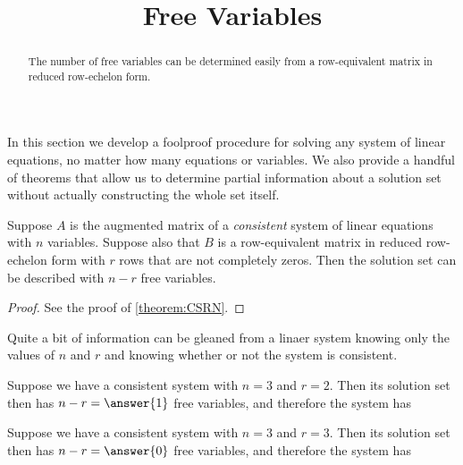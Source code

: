 \documentclass{ximera}
\title{Free Variables}
\begin{document}
\begin{abstract}
  The number of free variables can be determined easily from a
  row-equivalent matrix in reduced row-echelon form.
\end{abstract}
\maketitle

In this section we develop a foolproof procedure for solving any system of linear equations, no matter how many equations or variables.  We also provide a handful of theorems that allow us to determine partial information about a solution set without actually constructing the whole set itself.

\begin{theorem}
\label{theorem:FVCS}

Suppose $A$ is the augmented matrix of a \textit{consistent} system of
linear equations with $n$ variables.  Suppose also that $B$ is a
row-equivalent matrix in reduced row-echelon form with $r$ rows that
are not completely zeros.  Then the solution set can be described with
$n-r$ free variables.

\begin{proof}
See the proof of \ref{theorem:CSRN}.
\end{proof}
\end{theorem}

Quite a bit of information can be gleaned from a linaer system knowing
only the values of $n$ and $r$ and knowing whether or not the system
is consistent.

\begin{example}
Suppose we have a consistent system with $n=3$ and $r=2$.  Then its solution set then has $n-r=\answer{1}$ free variables, and therefore the system has
\begin{multipleChoice}
\end{multipleChoice}
\end{example}

\begin{example}
Suppose we have a consistent system with $n=3$ and $r=3$.  Then its solution set then has $n-r=\answer{0}$ free variables, and therefore the system has
\begin{multipleChoice}
\end{multipleChoice}
\end{example}
\end{document}
